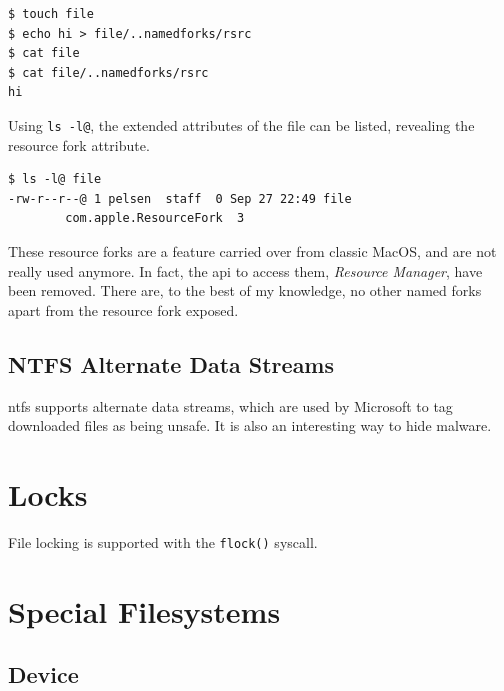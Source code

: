 \documentclass[a4paper]{article}
\begin{document}
\begin{verbatim}
$ touch file
$ echo hi > file/..namedforks/rsrc
$ cat file
$ cat file/..namedforks/rsrc
hi  
\end{verbatim}

Using \verb|ls -l@|, the extended attributes of the file can be listed, revealing the resource fork attribute.

\begin{verbatim}
$ ls -l@ file
-rw-r--r--@ 1 pelsen  staff  0 Sep 27 22:49 file
        com.apple.ResourceFork  3  
\end{verbatim}

These resource forks are a feature carried over from classic MacOS, and are not really used anymore. In fact, the \gls{api} to access them, \emph{Resource Manager}, have been removed. There are, to the best of my knowledge, no other named forks apart from the resource fork exposed.

\subsection{NTFS Alternate Data Streams}


\gls{ntfs} supports alternate data streams, which are used by Microsoft to tag downloaded files as being unsafe. It is also an interesting way to hide malware.

\section{Locks}

File locking is supported with the \verb|flock()| syscall.


\section{Special Filesystems}


\subsection{Device}

\end{document}
